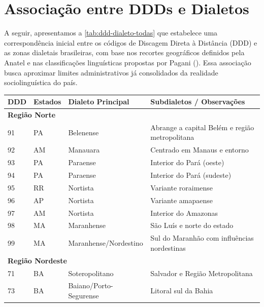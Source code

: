 \section{Associação entre DDDs e Dialetos}
A seguir, apresentamos a \autoref{tab:ddd-dialeto-todas} que estabelece uma correspondência inicial entre os códigos de Discagem Direta à Distância (DDD) e as zonas dialetais brasileiras, com base nos recortes geográficos definidos pela Anatel e nas classificações linguísticas propostas por Pagani (\citeyear{pagani2022}). Essa associação busca aproximar limites administrativos já consolidados da realidade sociolinguística do país.

\begin{table}[ht]
  \centering
  \tiny
  \setlength{\tabcolsep}{6pt}
  \begin{tabular}{llll}
    \toprule
    \textbf{DDD} & \textbf{Estados} & \textbf{Dialeto Principal} & \textbf{Subdialetos / Observações} \\
    \midrule
    \multicolumn{4}{l}{\textbf{Região Norte}} \\ 
    91 & PA      & Belenense             & Abrange a capital Belém e região metropolitana \\
    92 & AM      & Manauara              & Centrado em Manaus e entorno                  \\
    93 & PA      & Paraense              & Interior do Pará (oeste)                      \\
    94 & PA      & Paraense              & Interior do Pará (sudeste)                    \\
    95 & RR      & Nortista              & Variante roraimense                           \\
    96 & AP      & Nortista              & Variante amapaense                            \\
    97 & AM      & Nortista              & Interior do Amazonas                          \\
    98 & MA      & Maranhense            & São Luís e norte do estado                    \\
    99 & MA      & Maranhense/Nordestino & Sul do Maranhão com influências nordestinas   \\
    \midrule
    \multicolumn{4}{l}{\textbf{Região Nordeste}} \\ 
    71 & BA & Soteropolitano          & Salvador e Região Metropolitana          \\
    73 & BA & Baiano/Porto-Segurense  & Litoral sul da Bahia                     \\

\end{tabular}
\end{table}
